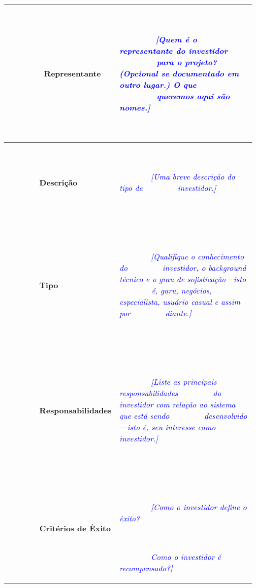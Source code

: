 \documentclass[a4paper]{article}
\begin{document}
\bigskip

\begin{flushleft}
\tablefirsthead{}
\tablehead{}
\tabletail{}
\tablelasttail{}
\begin{supertabular}{|m{1.2684599in}|m{4.84416in}|}
\hline
~

\ \ \ \ \ \ \ \ \textbf{Representante}

~
 &
~

\ \ \ \ \ \ \ \ \textit{\textcolor{blue}{[Quem \'e o representante do investidor \ \ \ \ \ \ \ \ para o projeto?
(Opcional se documentado em outro lugar.) O que \ \ \ \ \ \ \ \ queremos aqui s\~ao nomes.]}}

~
\\\hline
~

\ \ \ \ \ \ \ \ \textbf{Descri\c{c}\~ao}

~
 &
~

\ \ \ \ \ \ \ \ \textit{\textcolor{blue}{[Uma breve descri\c{c}\~ao do tipo de \ \ \ \ \ \ \ \ investidor.]}}

~
\\\hline
~

\ \ \ \ \ \ \ \ \textbf{Tipo}

~
 &
~

\ \ \ \ \ \ \ \ \textit{\textcolor{blue}{[Qualifique o conhecimento do \ \ \ \ \ \ \ \ investidor, o background
t\'ecnico e o grau de sofistica\c{c}\~ao---isto \ \ \ \ \ \ \ \ \'e, guru, neg\'ocios, especialista, usu\'ario casual e
assim por \ \ \ \ \ \ \ \ diante.]}}

~
\\\hline
~

\ \ \ \ \ \ \ \ \textbf{Responsabilidades}

~
 &
~

\ \ \ \ \ \ \ \ \textit{\textcolor{blue}{[Liste as principais responsabilidades \ \ \ \ \ \ \ \ do investidor com
rela\c{c}\~ao ao sistema que est\'a sendo \ \ \ \ \ \ \ \ desenvolvido---isto \'e, seu interesse como investidor.]}}

~
\\\hline
~

\ \ \ \ \ \ \ \ \textbf{Crit\'erios de \^Exito}

~
 &
~

\ \ \ \ \ \ \ \ \textit{\textcolor{blue}{[Como o investidor define o \^exito? }}\ \ \ \ \ \ \ \ 

~

\ \ \ \ \ \ \ \ \textit{\textcolor{blue}{Como o investidor \'e recompensado?]}}


\end{supertabular}
\end{flushleft}
\end{document}
